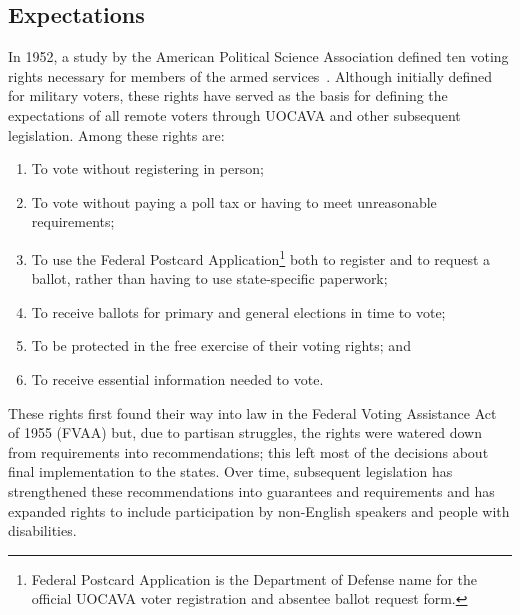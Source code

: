\subsection{Expectations}

In 1952, a study by the American Political Science Association defined
ten voting rights necessary for members of the armed
services~\cite{american1952findings}. Although initially defined for
military voters, these rights have served as the basis for defining
the expectations of all remote voters through UOCAVA and other
subsequent legislation. Among these rights are:

\begin{enumerate}
  \item To vote without registering in person;
  \item To vote without paying a poll tax or having to meet
    unreasonable requirements;
  \item To use the Federal Postcard Application\footnote{Federal
      Postcard Application is the Department of Defense name for the
      official UOCAVA voter registration and absentee ballot request
      form.} both to register and to request a ballot, rather than
    having to use state-specific paperwork;
  \item To receive ballots for primary and general elections in time to vote;
  \item To be protected in the free exercise of their voting rights;
    and 
  \item To receive essential information needed to vote.
\end{enumerate}

These rights first found their way into law in the Federal Voting
Assistance Act of 1955 (FVAA) but, due to partisan struggles, the
rights were watered down from requirements into recommendations; this
left most of the decisions about final implementation to the
states. Over time, subsequent legislation has strengthened these
recommendations into guarantees and requirements and has expanded
rights to include participation by non-English speakers and people
with disabilities.



